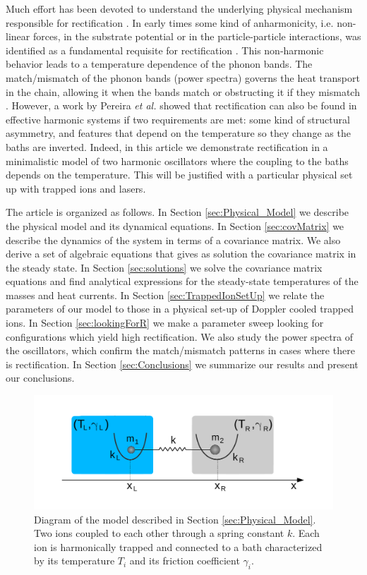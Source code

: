 Much effort has been devoted to  understand the underlying physical mechanism responsible for  rectification \cite{Pereira2019}.
%
In early times some kind of anharmonicity,  i.e. non-linear forces, in the substrate potential or in the particle-particle interactions, was identified as a fundamental requisite for rectification \cite{Li2012,Li2008,Hu2006,Zeng2008,Katz2016,Benenti2016}. This non-harmonic behavior leads to a temperature dependence of the phonon bands. The match/mismatch of the phonon bands (power spectra) governs the heat transport in the chain, allowing it when the bands match or obstructing it if they mismatch \cite{Terraneo2002,Li2004}. However, a work by Pereira \textit{et al.} \cite{Pereira2017} showed that rectification can also be found in effective harmonic systems if two requirements are met: some kind of structural asymmetry, and features that depend on the temperature so they change as the baths are inverted. Indeed,  in this article we demonstrate rectification in a minimalistic model of two harmonic oscillators where the coupling to the baths depends on the temperature.
%
This will be justified with a particular physical set up with trapped ions and lasers.

%

The article is organized as follows. In Section \ref{sec:Physical_Model}
we describe the physical model and its dynamical equations. In Section \ref{sec:covMatrix} we describe the dynamics of the system in terms of a covariance matrix. We also derive a set of algebraic equations that gives as solution the covariance matrix in the steady state. In Section \ref{sec:solutions} we solve the covariance matrix equations and find analytical expressions for the steady-state temperatures of the masses and heat currents. In Section \ref{sec:TrappedIonSetUp} we relate the parameters of our model to those in a physical set-up of Doppler cooled trapped ions. In Section \ref{sec:lookingForR} we make a parameter sweep looking for configurations which yield high rectification. We also study the power spectra of the oscillators, which confirm the match/mismatch patterns in cases where there is rectification. In Section \ref{sec:Conclusions} we summarize our results and present our conclusions.

\begin{figure}
  \includegraphics[width=1.1\linewidth]{Figures/model_diagram.pdf}
  \caption{Diagram of the model described in Section \ref{sec:Physical_Model}. Two ions coupled to each other through a spring constant $k$. Each ion is harmonically trapped and connected to a bath characterized by its temperature $T_i$ and its friction coefficient $\gamma_i$. }
  \label{fig:model_diagram}
\end{figure}

